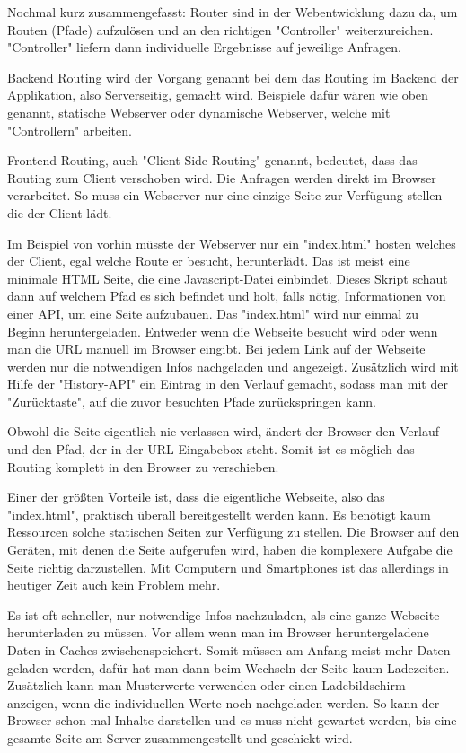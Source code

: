 Nochmal kurz zusammengefasst: Router sind in der Webentwicklung dazu da, um Routen (Pfade) aufzulösen und an den richtigen "Controller" weiterzureichen. "Controller" liefern dann individuelle Ergebnisse auf jeweilige Anfragen.


Backend Routing wird der Vorgang genannt bei dem das Routing im Backend der Applikation, also Serverseitig, gemacht wird. Beispiele dafür wären wie oben genannt, statische Webserver oder dynamische Webserver, welche mit "Controllern" arbeiten.


Frontend Routing, auch "Client-Side-Routing" genannt, bedeutet, dass das Routing zum Client verschoben wird. Die Anfragen werden direkt im Browser verarbeitet. So muss ein Webserver nur eine einzige Seite zur Verfügung stellen die der Client lädt.

Im Beispiel von vorhin müsste der Webserver nur ein "{\ttfamily index.html}" hosten welches der Client, egal welche Route er besucht, herunterlädt. Das ist meist eine minimale HTML Seite, die eine Javascript-Datei einbindet. Dieses Skript schaut dann auf welchem Pfad es sich befindet und holt, falls nötig, Informationen von einer API, um eine Seite aufzubauen. Das "{\ttfamily index.html}" wird nur einmal zu Beginn heruntergeladen. Entweder wenn die Webseite besucht wird oder wenn man die URL manuell im Browser eingibt. Bei jedem Link auf der Webseite werden nur die notwendigen Infos nachgeladen und angezeigt. Zusätzlich wird mit Hilfe der "History-API" ein Eintrag in den Verlauf gemacht, sodass man mit der "Zurücktaste", auf die zuvor besuchten Pfade zurückspringen kann.

Obwohl die Seite eigentlich nie verlassen wird, ändert der Browser den Verlauf und den Pfad, der in der URL-Eingabebox steht. Somit ist es möglich das Routing komplett in den Browser zu verschieben.


Einer der größten Vorteile ist, dass die eigentliche Webseite, also das "{\ttfamily index.html}", praktisch überall bereitgestellt werden kann. Es benötigt kaum Ressourcen solche statischen Seiten zur Verfügung zu stellen. Die Browser auf den Geräten, mit denen die Seite aufgerufen wird, haben die komplexere Aufgabe die Seite richtig darzustellen. Mit Computern und Smartphones ist das allerdings in heutiger Zeit auch kein Problem mehr.

Es ist oft schneller, nur notwendige Infos nachzuladen, als eine ganze Webseite herunterladen zu müssen. Vor allem wenn man im Browser heruntergeladene Daten in Caches zwischenspeichert. Somit müssen am Anfang meist mehr Daten geladen werden, dafür hat man dann beim Wechseln der Seite kaum Ladezeiten. Zusätzlich kann man Musterwerte verwenden oder einen Ladebildschirm anzeigen, wenn die individuellen Werte noch nachgeladen werden. So kann der Browser schon mal Inhalte darstellen und es muss nicht gewartet werden, bis eine gesamte Seite am Server zusammengestellt und geschickt wird.

